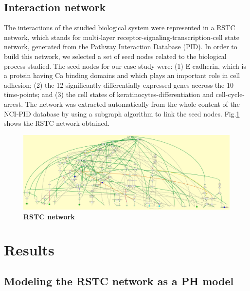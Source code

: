 \documentclass[11pt,a4paper,twoside]{epig}
\begin{document}
\subsection{Interaction network}
\label{ssec:RSTC}
The interactions of the studied biological system  were represented in
 a RSTC network, which stands for  multi-layer receptor-signaling-transcription-cell state network, generated from the Pathway Interaction Database (PID).
In order to build this network, we selected a set of seed nodes related to the biological process studied.
The seed nodes for our case study were:  (1) E-cadherin, which is a protein having Ca binding domains and which plays an important role in cell adhesion;
(2) the 12 significantly differentially expressed genes accross the 10 time-points; and (3) the cell states of keratinocytes-differentiation and cell-cycle-arrest. 
The network was extracted automatically from the whole content of the NCI-PID database by using a subgraph algorithm to link the seed nodes\cite{guziolowski2012automatic}. 
Fig.\ref{fig:network}  shows the RSTC network obtained.

\begin{figure}
 \centering
 \includegraphics[width=13cm]{net.jpg}
\caption{{\bf RSTC network}} 
 \label{fig:network}
\end{figure}


\section{Results}


\subsection{Modeling the RSTC network as a PH model}

\end{document}

